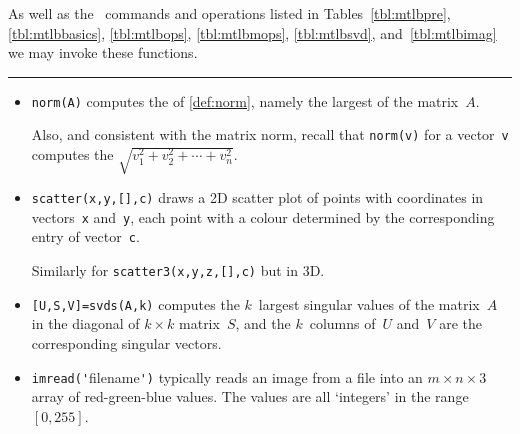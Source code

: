 \begin{table}
\caption{As well as the \script\ commands and operations listed in Tables~\ref{tbl:mtlbpre}, \ref{tbl:mtlbbasics}, \ref{tbl:mtlbops}, \ref{tbl:mtlbmops}, \ref{tbl:mtlbsvd}, and~\ref{tbl:mtlbimag}  we may invoke these functions.} \label{tbl:mtlbnorm}
\hrule
\begin{minipage}{\linewidth}
\begin{itemize}
\item {}\verb|norm(A)| computes the  of \autoref{def:norm}, namely the largest  of the matrix~\(A\).

Also, and consistent with the matrix norm, recall that \verb|norm(v)| for a vector~\verb|v| computes the  \(\sqrt{v_1^2+v_2^2+\cdots+v_n^2}\).



\item {}\verb|scatter(x,y,[],c)| draws a 2D scatter plot of points with coordinates in vectors~\verb|x| and~\verb|y|, each point with a colour determined by the corresponding entry of vector~\verb|c|.  

Similarly for \verb|scatter3(x,y,z,[],c)| but in 3D.

\item {}\verb|[U,S,V]=svds(A,k)| computes the \(k\)~largest singular values of the matrix~\(A\) in the diagonal of \(k\times k\) matrix~\(S\), and the  \(k\)~columns of~\(U\) and~\(V\) are the corresponding singular vectors.


\item  {}\verb|imread('|filename\verb|')| typically reads an image from a file into an \(m\times n\times 3\) array of red-green-blue values. 
The values are all `integers' in the range~\([0,255]\).


\end{itemize}
\end{minipage}
\end{table}
